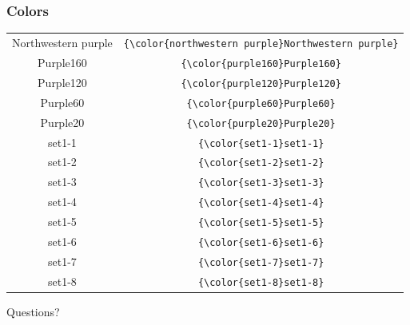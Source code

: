 \documentclass[xcolor=dvipsnames,aspectratio=169]{beamer}
\begin{document}
\begin{frame}[fragile]
  \frametitle{Colors}
  \begin{tabular}{cc}
    {\color{northwestern purple}Northwestern purple} & \verb!{\color{northwestern purple}Northwestern purple}!\\
    {\color{purple160}Purple160} & \verb!{\color{purple160}Purple160}!\\
    {\color{purple120}Purple120} & \verb!{\color{purple120}Purple120}!\\
    {\color{purple60}Purple60} & \verb!{\color{purple60}Purple60}!\\
    {\color{purple20}Purple20} & \verb!{\color{purple20}Purple20}!\\
    {\color{set1-1}set1-1} & \verb!{\color{set1-1}set1-1}!\\
    {\color{set1-2}set1-2} & \verb!{\color{set1-2}set1-2}!\\
    {\color{set1-3}set1-3} & \verb!{\color{set1-3}set1-3}!\\
    {\color{set1-4}set1-4} & \verb!{\color{set1-4}set1-4}!\\
    {\color{set1-5}set1-5} & \verb!{\color{set1-5}set1-5}!\\
    {\color{set1-6}set1-6} & \verb!{\color{set1-6}set1-6}!\\
    {\color{set1-7}set1-7} & \verb!{\color{set1-7}set1-7}!\\
    {\color{set1-8}set1-8} & \verb!{\color{set1-8}set1-8}!\\
  \end{tabular}
\end{frame}


\begin{frame}
  \vspace{1cm}
  \begin{center}
    \Huge{{\color{northwestern purple}Questions?}}
  \end{center}
\end{frame}
\end{document}
